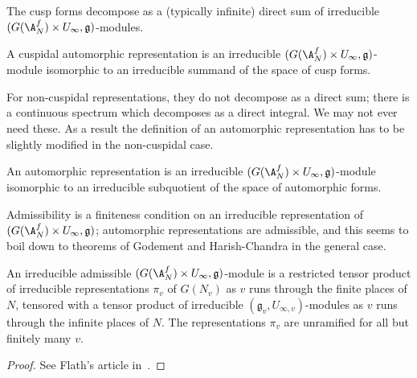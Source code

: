 \begin{theorem}\label{cuspidal_automorphic_form_decomposition} The cusp forms decompose as a (typically infinite) direct sum of irreducible $(G(\A_N^f)\times U_\infty,\mathfrak{g})$-modules.
\end{theorem}
\begin{definition}\label{cuspidal_automorphic_representation}\notready A cuspidal automorphic representation is an irreducible $(G(\A_N^f)\times U_\infty,\mathfrak{g})$-module isomorphic to an irreducible summand of the space of cusp forms.
\end{definition}

For non-cuspidal representations, they do not decompose as a direct sum; there is a continuous spectrum which decomposes as a direct integral. We may not ever need these. As a result the definition of an automorphic representation has to be slightly modified in the non-cuspidal case.

\begin{definition}\label{automorphic_representation}\notready An automorphic representation is an irreducible $(G(\A_N^f)\times U_\infty,\mathfrak{g})$-module isomorphic to an irreducible subquotient of the space of automorphic forms.
\end{definition}

Admissibility is a finiteness condition on an irreducible representation of $(G(\A_N^f)\times U_\infty,\mathfrak{g})$; automorphic representations are admissible, and this seems to boil down to theorems of Godement and Harish-Chandra in the general case.


\begin{theorem}\label{automorphic_representation_local_decomposition}\notready An irreducible admissible $(G(\A_N^f)\times U_\infty,\mathfrak{g})$-module is a restricted tensor product of irreducible representations $\pi_v$ of $G(N_v)$ as $v$ runs through the finite places of $N$, tensored with a tensor product of irreducible $(\mathfrak{g}_v,U_{\infty,v})$-modules as $v$ runs through the infinite places of $N$. The representations $\pi_v$ are unramified for all but finitely many $v$.
\end{theorem}
\begin{proof} See Flath's article in~\cite{corvallis2}.
\end{proof}

